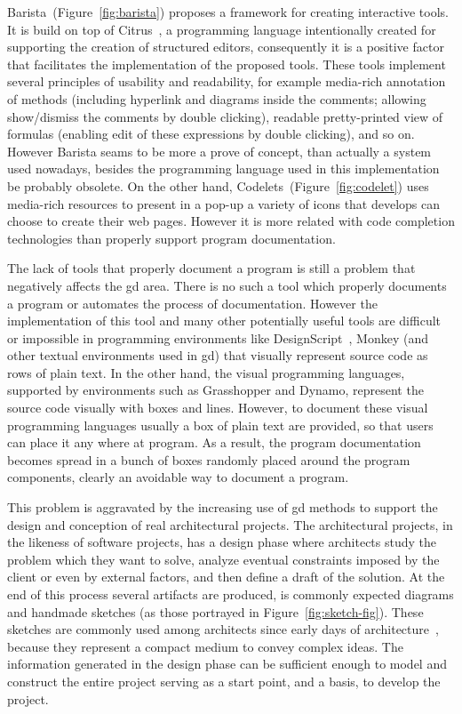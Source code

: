 Barista~(Figure~\ref{fig:barista}) proposes a framework for creating interactive tools. It is build on top of Citrus~\citep{ko2005citrus}, a programming language intentionally created for supporting the creation of structured editors, consequently it is a positive factor that facilitates the implementation of the proposed tools. These tools implement several principles of usability and readability, for example media-rich annotation of methods (including hyperlink and diagrams inside the comments; allowing show/dismiss the comments by double clicking), readable pretty-printed view of formulas (enabling edit of these expressions by double clicking), and so on. However Barista seams to be more a prove of concept, than actually a system used nowadays, besides the programming language used in this implementation be probably obsolete. On the other hand, Codelets~(Figure~\ref{fig:codelet}) uses media-rich resources to present in a pop-up a variety of icons that develops can choose to create their web pages. However it is more related with code completion technologies than properly support program documentation.

The lack of tools that properly document a program is still a problem that negatively affects the \gls{gd} area. There is no such a tool which properly documents a program or automates the process of documentation. However the implementation of this tool and many other potentially useful tools are difficult or impossible in programming environments like DesignScript~\citep{aish2012designscript}, Monkey (and other textual environments used in \gls{gd}) that visually represent source code as rows of plain text. In the other hand, the visual programming languages, supported by environments such as Grasshopper and Dynamo, represent the source code visually with boxes and lines. However, to document these visual programming languages usually a box of plain text are provided, so that users can place it any where at program. As a result, the program documentation becomes spread in a bunch of boxes randomly placed around the program components, clearly an avoidable way to document a program.

This problem is aggravated by the increasing use of \gls{gd} methods to support the design and conception of real architectural projects. The architectural projects, in the likeness of software projects, has a design phase where architects study the problem which they want to solve, analyze eventual constraints imposed by the client or even by external factors, and then define a draft of the solution. At the end of this process several artifacts are produced, is commonly expected diagrams and handmade sketches (as those portrayed in Figure~\ref{fig:sketch-fig}). These sketches are commonly used among architects since early days of architecture~\citep{do2001thinking}, because they represent a compact medium to convey complex ideas. The information generated in the design phase can be sufficient enough to model and construct the entire project serving as a start point, and a basis, to develop the project. 

